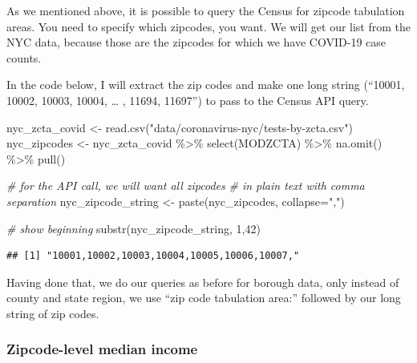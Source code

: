 \documentclass[
  openany]{book}
\newenvironment{Shaded}{\begin{snugshade}}{\end{snugshade}}
\newcommand{\AttributeTok}[1]{\textcolor[rgb]{0.77,0.63,0.00}{#1}}
\newcommand{\CommentTok}[1]{\textcolor[rgb]{0.56,0.35,0.01}{\textit{#1}}}
\newcommand{\DecValTok}[1]{\textcolor[rgb]{0.00,0.00,0.81}{#1}}
\newcommand{\FunctionTok}[1]{\textcolor[rgb]{0.00,0.00,0.00}{#1}}
\newcommand{\NormalTok}[1]{#1}
\newcommand{\OtherTok}[1]{\textcolor[rgb]{0.56,0.35,0.01}{#1}}
\newcommand{\SpecialCharTok}[1]{\textcolor[rgb]{0.00,0.00,0.00}{#1}}
\newcommand{\StringTok}[1]{\textcolor[rgb]{0.31,0.60,0.02}{#1}}
\begin{document}
As we mentioned above, it is possible to query the Census for zipcode tabulation areas. You need to specify which zipcodes, you want. We will get our list from the NYC data, because those are the zipcodes for which we have COVID-19 case counts.

In the code below, I will extract the zip codes and make one long string (``10001, 10002, 10003, 10004, \ldots{} , 11694, 11697'') to pass to the Census API query.

\begin{Shaded}
\begin{Highlighting}[]
\NormalTok{nyc\_zcta\_covid }\OtherTok{\textless{}{-}} \FunctionTok{read.csv}\NormalTok{(}\StringTok{"data/coronavirus{-}nyc/tests{-}by{-}zcta.csv"}\NormalTok{)}
\NormalTok{nyc\_zipcodes }\OtherTok{\textless{}{-}}\NormalTok{ nyc\_zcta\_covid }\SpecialCharTok{\%\textgreater{}\%} \FunctionTok{select}\NormalTok{(MODZCTA) }\SpecialCharTok{\%\textgreater{}\%} \FunctionTok{na.omit}\NormalTok{() }\SpecialCharTok{\%\textgreater{}\%} \FunctionTok{pull}\NormalTok{()}

\CommentTok{\# for the API call, we will want all zipcodes }
\CommentTok{\# in plain text with comma separation}
\NormalTok{nyc\_zipcode\_string }\OtherTok{\textless{}{-}} \FunctionTok{paste}\NormalTok{(nyc\_zipcodes, }\AttributeTok{collapse=}\StringTok{","}\NormalTok{)}

\CommentTok{\# show beginning}
\FunctionTok{substr}\NormalTok{(nyc\_zipcode\_string, }\DecValTok{1}\NormalTok{,}\DecValTok{42}\NormalTok{)}
\end{Highlighting}
\end{Shaded}

\begin{verbatim}
## [1] "10001,10002,10003,10004,10005,10006,10007,"
\end{verbatim}

Having done that, we do our queries as before for borough data, only instead of county and state region, we use ``zip code tabulation area:'' followed by our long string of zip codes.

\hypertarget{zipcode-level-median-income}{%
\subsubsection*{Zipcode-level median income}\label{zipcode-level-median-income}}
\end{document}
